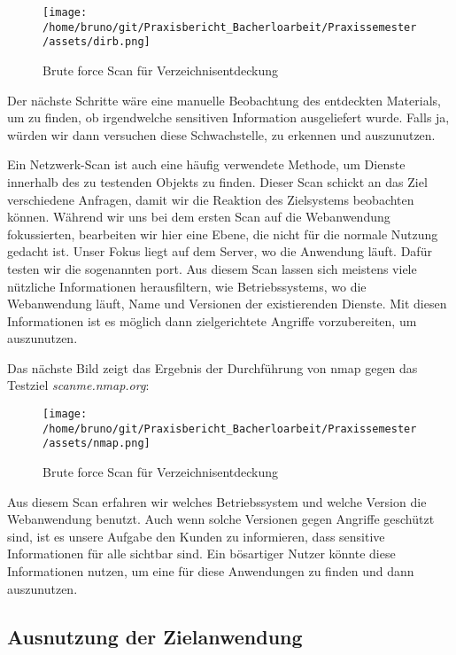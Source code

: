 \begin{figure}[H]
    \centering
    \texttt{[image: /home/bruno/git/Praxisbericht\_Bacherloarbeit/Praxissemester/assets/dirb.png]}
    \caption{Brute force Scan für Verzeichnisentdeckung}
    \centering
\end{figure}

Der nächste Schritte wäre eine manuelle Beobachtung des entdeckten Materials, um zu finden, ob irgendwelche sensitiven Information ausgeliefert wurde. Falls ja, würden wir dann versuchen diese \gls{Schwachstelle}, zu erkennen und auszunutzen.

Ein Netzwerk-Scan ist auch eine häufig verwendete Methode, um Dienste innerhalb des zu testenden Objekts zu finden. Dieser Scan schickt an das Ziel verschiedene Anfragen, damit wir die Reaktion des Zielsystems beobachten können. Während wir uns bei dem ersten Scan auf die Webanwendung fokussierten, bearbeiten wir hier eine Ebene, die nicht für die normale Nutzung gedacht ist. Unser Fokus liegt auf dem Server, wo die Anwendung läuft. Dafür testen wir die sogenannten \gls{port}. Aus diesem Scan lassen sich meistens viele nützliche Informationen herausfiltern, wie Betriebssystems, wo die Webanwendung läuft, Name und Versionen der existierenden Dienste. Mit diesen Informationen ist es möglich dann zielgerichtete Angriffe vorzubereiten, um  auszunutzen.

Das nächste Bild zeigt das Ergebnis der Durchführung von \gls{nmap} gegen das Testziel \textit{scanme.nmap.org}:

\begin{figure}[H]
    \centering
    \texttt{[image: /home/bruno/git/Praxisbericht\_Bacherloarbeit/Praxissemester/assets/nmap.png]}
    \caption{Brute force Scan für Verzeichnisentdeckung}
    \centering
\end{figure}

Aus diesem Scan erfahren wir welches Betriebssystem und welche Version die Webanwendung benutzt. Auch wenn solche Versionen gegen Angriffe geschützt sind, ist es unsere Aufgabe den Kunden zu informieren, dass sensitive Informationen für alle sichtbar sind. Ein bösartiger Nutzer könnte diese Informationen nutzen, um eine  für diese Anwendungen zu finden und dann auszunutzen.

\subsection{Ausnutzung der Zielanwendung}


